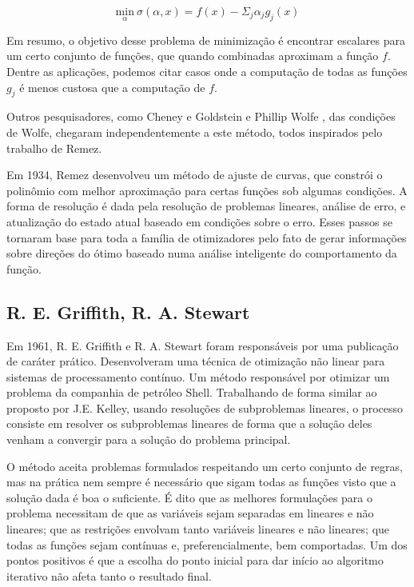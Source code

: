 \vspace{-15pt}
\begin{equation}
  \underset{\alpha}{\mathrm{min}}\ \sigma(\alpha, x) = f(x) - \Sigma_j \alpha_j g_j(x)
\end{equation}

Em resumo, o objetivo desse problema de minimização é encontrar escalares para um certo
conjunto de funções, que quando combinadas aproximam a função \(f\). Dentre as aplicações,
podemos citar casos onde a computação de todas as funções \(g_j\) é menos custosa que a
computação de \(f\).

Outros pesquisadores, como Cheney e Goldstein \cite{cheney1959newton} e Phillip Wolfe \cite{wolfe1960rand},
das condições de Wolfe, chegaram independentemente a este método, todos inspirados pelo trabalho de Remez.

Em 1934, Remez \cite{remez1934procede} desenvolveu um método de ajuste de curvas, que constrói o polinômio
com melhor aproximação para certas funções sob algumas condições. A forma de resolução é dada
pela resolução de problemas lineares, análise de erro, e atualização do estado atual baseado
em condições sobre o erro. Esses passos se tornaram base para toda a família de otimizadores
pelo fato de gerar informações sobre direções do ótimo baseado numa análise inteligente do
comportamento da função.

\subsection{R. E. Griffith, R. A. Stewart}

\noindent
Em 1961, R. E. Griffith e R. A. Stewart \cite{griffith1961nonlinear} foram responsáveis por uma publicação
de caráter prático. Desenvolveram uma técnica de otimização não linear para sistemas de processamento
contínuo. Um método responsável por otimizar um problema da companhia de petróleo Shell. Trabalhando
de forma similar ao proposto por J.E. Kelley, usando resoluções de subproblemas lineares, o processo
consiste em resolver os subproblemas lineares de forma que a solução deles venham a convergir para
a solução do problema principal.

O método aceita problemas formulados respeitando um certo conjunto de regras, mas na prática nem
sempre é necessário que sigam todas as funções visto que a solução dada é boa o suficiente. É dito
que as melhores formulações para o problema necessitam de que as variáveis sejam separadas em lineares
e não lineares; que as restrições envolvam tanto variáveis lineares e não lineares; que todas as funções
sejam contínuas e, preferencialmente, bem comportadas. Um dos pontos positivos é que a escolha do ponto
inicial para dar início ao algoritmo iterativo não afeta tanto o resultado final.

